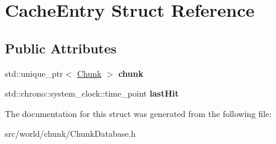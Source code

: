 \hypertarget{structCacheEntry}{\section{Cache\-Entry Struct Reference}
\label{structCacheEntry}
}
\subsection*{Public Attributes}
\begin{DoxyCompactItemize}
\item 
\hypertarget{structCacheEntry_aee492f9285bb4a0415414628bd484e5b}{std\-::unique\-\_\-ptr$<$ \hyperlink{classChunk}{Chunk} $>$ {\bfseries chunk}}\label{structCacheEntry_aee492f9285bb4a0415414628bd484e5b}

\item 
\hypertarget{structCacheEntry_a2f38d76a011b952a0d4d3acbbb88b747}{std\-::chrono\-::system\-\_\-clock\-::time\-\_\-point {\bfseries last\-Hit}}\label{structCacheEntry_a2f38d76a011b952a0d4d3acbbb88b747}

\end{DoxyCompactItemize}


The documentation for this struct was generated from the following file\-:\begin{DoxyCompactItemize}
\item 
src/world/chunk/Chunk\-Database.\-h\end{DoxyCompactItemize}
